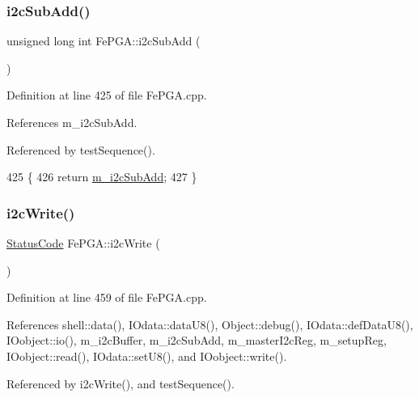 \subsubsection{\texorpdfstring{i2c\+Sub\+Add()}{i2cSubAdd()}}
{\footnotesize\ttfamily unsigned long int Fe\+P\+G\+A\+::i2c\+Sub\+Add (\begin{DoxyParamCaption}{ }\end{DoxyParamCaption})}



Definition at line 425 of file Fe\+P\+G\+A.\+cpp.



References m\+\_\+i2c\+Sub\+Add.



Referenced by test\+Sequence().


\begin{DoxyCode}
425                                   \{
426   \textcolor{keywordflow}{return} \hyperlink{classFePGA_aba8c2c8d8e0d136826b9dd4c2d7c2e90}{m\_i2cSubAdd}; 
427 \}
\end{DoxyCode}
\mbox{\label{classFePGA_a27b9c9bb486cea35b1bbcac5da96f527}} 
\subsubsection{\texorpdfstring{i2c\+Write()}{i2cWrite()}\hspace{0.1cm}{\footnotesize\ttfamily [1/2]}}
{\footnotesize\ttfamily \hyperlink{classStatusCode}{Status\+Code} Fe\+P\+G\+A\+::i2c\+Write (\begin{DoxyParamCaption}{ }\end{DoxyParamCaption})}



Definition at line 459 of file Fe\+P\+G\+A.\+cpp.



References shell\+::data(), I\+Odata\+::data\+U8(), Object\+::debug(), I\+Odata\+::def\+Data\+U8(), I\+Oobject\+::io(), m\+\_\+i2c\+Buffer, m\+\_\+i2c\+Sub\+Add, m\+\_\+master\+I2c\+Reg, m\+\_\+setup\+Reg, I\+Oobject\+::read(), I\+Odata\+::set\+U8(), and I\+Oobject\+::write().



Referenced by i2c\+Write(), and test\+Sequence().


